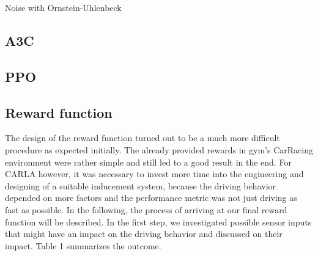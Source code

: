 \documentclass[letterpaper, 10 pt, conference]{ieeeconf}  %
\begin{document}
Noise with Ornstein-Uhlenbeck

\subsection{A3C}
\subsection{PPO}
\subsection{Reward function}
The design of the reward function turned out to be a much more difficult procedure as expected initially. The already provided rewards in gym's CarRacing environment were rather simple and still led to a good result in the end. For CARLA however, it was necessary to invest more time into the engineering and designing of a suitable inducement system, because the driving behavior depended on more factors and the performance metric was not just driving as fast as possible. In the following, the process of arriving at our final reward function will be described. \newline 
In the first step, we investigated possible sensor inputs that might have an impact on the driving behavior and discussed on their impact. Table 1 summarizes the outcome.
\newline 
\end{document}
